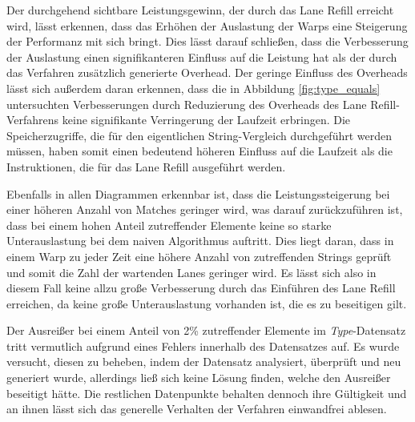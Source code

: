 Der durchgehend sichtbare Leistungsgewinn, der durch das Lane Refill erreicht wird, lässt erkennen, dass das Erhöhen der Auslastung der Warps eine Steigerung der Performanz mit sich bringt.
Dies lässt darauf schließen, dass die Verbesserung der Auslastung einen signifikanteren Einfluss auf die Leistung hat als der durch das Verfahren zusätzlich generierte Overhead.
Der geringe Einfluss des Overheads lässt sich außerdem daran erkennen, dass die in Abbildung \ref{fig:type_equals} untersuchten Verbesserungen durch Reduzierung des Overheads des Lane Refill-Verfahrens keine signifikante Verringerung der Laufzeit erbringen.
Die Speicherzugriffe, die für den eigentlichen String-Vergleich durchgeführt werden müssen, haben somit einen bedeutend höheren Einfluss auf die Laufzeit als die Instruktionen, die für das Lane Refill ausgeführt werden.

Ebenfalls in allen Diagrammen erkennbar ist, dass die Leistungssteigerung bei einer höheren Anzahl von Matches geringer wird, was darauf zurückzuführen ist, dass bei einem hohen Anteil zutreffender Elemente keine so starke Unterauslastung bei dem naiven Algorithmus auftritt.
Dies liegt daran, dass in einem Warp zu jeder Zeit eine höhere Anzahl von zutreffenden Strings geprüft und somit die Zahl der wartenden Lanes geringer wird.
Es lässt sich also in diesem Fall keine allzu große Verbesserung durch das Einführen des Lane Refill erreichen, da keine große Unterauslastung vorhanden ist, die es zu beseitigen gilt.

Der Ausreißer bei einem Anteil von 2\% zutreffender Elemente im \emph{Type}-Datensatz tritt vermutlich aufgrund eines Fehlers innerhalb des Datensatzes auf.
Es wurde versucht, diesen zu beheben, indem der Datensatz analysiert, überprüft und neu generiert wurde, allerdings ließ sich keine Lösung finden, welche den Ausreißer beseitigt hätte.
Die restlichen Datenpunkte behalten dennoch ihre Gültigkeit und an ihnen lässt sich das generelle Verhalten der Verfahren einwandfrei ablesen.

